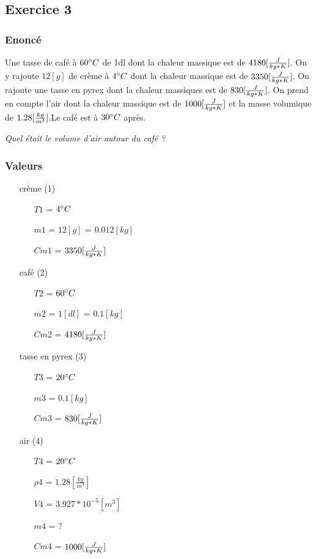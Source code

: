 \subsection{Exercice 3}
\subsubsection{Enoncé}
Une tasse de café à $60\celsius$ de 1dl dont la chaleur massique est de $4180[\cm]$. On y rajoute $12[g]$ de crème à $4\celsius$ dont la chaleur massique est de $3350[\cm]$. On rajoute une tasse en pyrex dont la chaleur massiques est de $830[\cm]$. On prend en compte l'air dont la chaleur massique est de $1000[\cm]$ et la masse volumique de $1.28[\kgmv]$.Le café est à $30\celsius$ après.


\textit{Quel était le volume d'air autour du café ?}
\subsubsection{Valeurs}
\begin{itemize}
    \item[crème] (1)
    \item[] 
    \begin{itemize}
        \item[$T1$] = $4\celsius$
        \item[$m1$] = $12[g]$ = $0.012[kg]$
        \item[$Cm1$] = $3350[\cm]$
    \end{itemize} 
    \item[café] (2)
    \item[] 
    \begin{itemize}
        \item[$T2$] = $60\celsius$
        \item[$m2$] = $1[dl]$ = $0.1[kg]$
        \item[$Cm2$] = $4180[\cm]$   
    \end{itemize} 
    \item[tasse en pyrex] (3)
    \item[] 
    \begin{itemize}
        \item[$T3$] = $20\celsius$
        \item[$m3$] = $0.1[kg]$
        \item[$Cm3$] = $830[\cm]$   
    \end{itemize} 
    \item[air] (4)
    \item[] 
    \begin{itemize}
        \item[$T4$] = $20\celsius$
        \item[${\rho}4$] = $1.28[\frac{kg}{m^3}]$
        \item[$V4$] = $3.927*10^{-5} [m^3]$ 
        \item[$m4$] = $?$
        \item[$Cm4$] = $1000[\cm]$   
    \end{itemize} 
\end{itemize}
